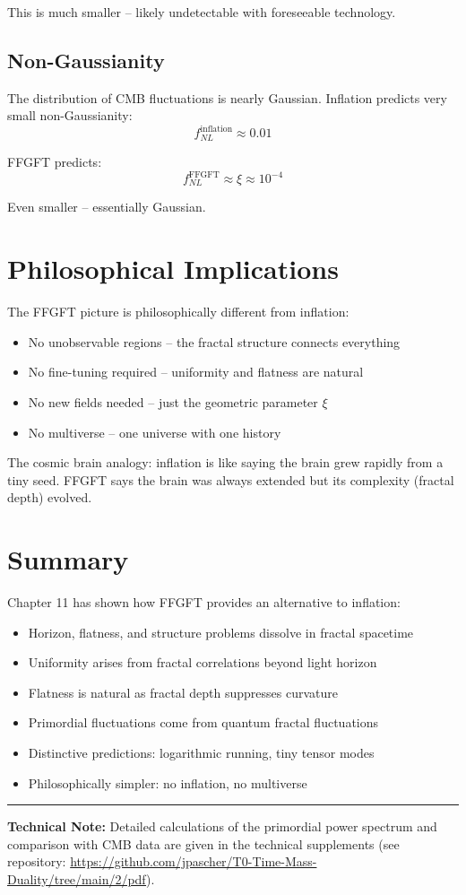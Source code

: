 This is much smaller -- likely undetectable with foreseeable technology.

\subsection{Non-Gaussianity}

The distribution of CMB fluctuations is nearly Gaussian. Inflation predicts very small non-Gaussianity:
\begin{equation}
f_{NL}^{\text{inflation}} \approx 0.01
\end{equation}

FFGFT predicts:
\begin{equation}
f_{NL}^{\text{FFGFT}} \approx \xi \approx 10^{-4}
\end{equation}

Even smaller -- essentially Gaussian.

\section{Philosophical Implications}

The FFGFT picture is philosophically different from inflation:

\begin{itemize}[leftmargin=*]
\item No unobservable regions -- the fractal structure connects everything
\item No fine-tuning required -- uniformity and flatness are natural
\item No new fields needed -- just the geometric parameter $\xi$
\item No multiverse -- one universe with one history
\end{itemize}

The cosmic brain analogy: inflation is like saying the brain grew rapidly from a tiny seed. FFGFT says the brain was always extended but its complexity (fractal depth) evolved.

\section{Summary}

Chapter 11 has shown how FFGFT provides an alternative to inflation:

\begin{itemize}[leftmargin=*]
\item Horizon, flatness, and structure problems dissolve in fractal spacetime
\item Uniformity arises from fractal correlations beyond light horizon
\item Flatness is natural as fractal depth suppresses curvature
\item Primordial fluctuations come from quantum fractal fluctuations
\item Distinctive predictions: logarithmic running, tiny tensor modes
\item Philosophically simpler: no inflation, no multiverse
\end{itemize}

\vspace{1cm}
\hrule
\vspace{0.5cm}
\noindent\textbf{Technical Note:} Detailed calculations of the primordial power spectrum and comparison with CMB data are given in the technical supplements (see repository: \url{https://github.com/jpascher/T0-Time-Mass-Duality/tree/main/2/pdf}).



